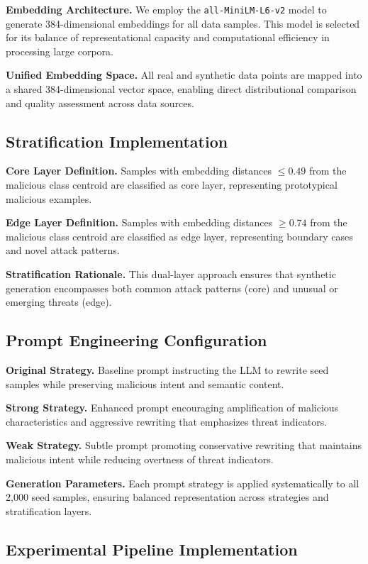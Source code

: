 \textbf{Embedding Architecture.} We employ the \texttt{all-MiniLM-L6-v2} model to generate 384-dimensional embeddings for all data samples. This model is selected for its balance of representational capacity and computational efficiency in processing large corpora.

\textbf{Unified Embedding Space.} All real and synthetic data points are mapped into a shared 384-dimensional vector space, enabling direct distributional comparison and quality assessment across data sources.

\subsection{Stratification Implementation}

\textbf{Core Layer Definition.} Samples with embedding distances $\leq 0.49$ from the malicious class centroid are classified as core layer, representing prototypical malicious examples.

\textbf{Edge Layer Definition.} Samples with embedding distances $\geq 0.74$ from the malicious class centroid are classified as edge layer, representing boundary cases and novel attack patterns.

\textbf{Stratification Rationale.} This dual-layer approach ensures that synthetic generation encompasses both common attack patterns (core) and unusual or emerging threats (edge).

\subsection{Prompt Engineering Configuration}

\textbf{Original Strategy.} Baseline prompt instructing the LLM to rewrite seed samples while preserving malicious intent and semantic content.

\textbf{Strong Strategy.} Enhanced prompt encouraging amplification of malicious characteristics and aggressive rewriting that emphasizes threat indicators.

\textbf{Weak Strategy.} Subtle prompt promoting conservative rewriting that maintains malicious intent while reducing overtness of threat indicators.

\textbf{Generation Parameters.} Each prompt strategy is applied systematically to all 2,000 seed samples, ensuring balanced representation across strategies and stratification layers.

\subsection{Experimental Pipeline Implementation}

